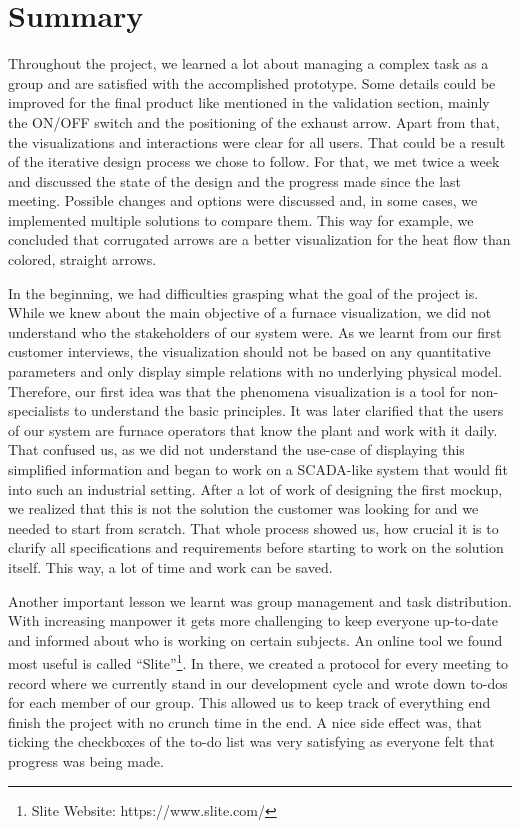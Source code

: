 \section*{Summary}

Throughout the project, we learned a lot about managing a complex task as a group and are satisfied with the accomplished prototype. Some details could be improved for the final product like mentioned in the validation section, mainly the ON/OFF switch and the positioning of the exhaust arrow. Apart from that, the visualizations and interactions were clear for all users. That could be a result of the iterative design process we chose to follow. For that, we met twice a week and discussed the state of the design and the progress made since the last meeting. Possible changes and options were discussed and, in some cases, we implemented multiple solutions to compare them. This way for example, we concluded that corrugated arrows are a better visualization for the heat flow than colored, straight arrows. 

In the beginning, we had difficulties grasping what the goal of the project is. While we knew about the main objective of a furnace visualization, we did not understand who the stakeholders of our system were. As we learnt from our first customer interviews, the visualization should not be based on any quantitative parameters and only display simple relations with no underlying physical model. Therefore, our first idea was that the phenomena visualization is a tool for non-specialists to understand the basic principles. It was later clarified that the users of our system are furnace operators that know the plant and work with it daily. That confused us, as we did not understand the use-case of displaying this simplified information and began to work on a \ac{SCADA}-like system that would fit into such an industrial setting. After a lot of work of designing the first mockup, we realized that this is not the solution the customer was looking for and we needed to start from scratch. That whole process showed us, how crucial it is to clarify all specifications and requirements before starting to work on the solution itself. This way, a lot of time and work can be saved. 

Another important lesson we learnt was group management and task distribution. With increasing manpower it gets more challenging to keep everyone up-to-date and informed about who is working on certain subjects. An online tool we found most useful is called “Slite”\footnote{Slite Website: https://www.slite.com/}. In there, we created a protocol for every meeting to record where we currently stand in our development cycle and wrote down to-dos for each member of our group. This allowed us to keep track of everything end finish the project with no crunch time in the end. A nice side effect was, that ticking the checkboxes of the to-do list was very satisfying as everyone felt that progress was being made.

